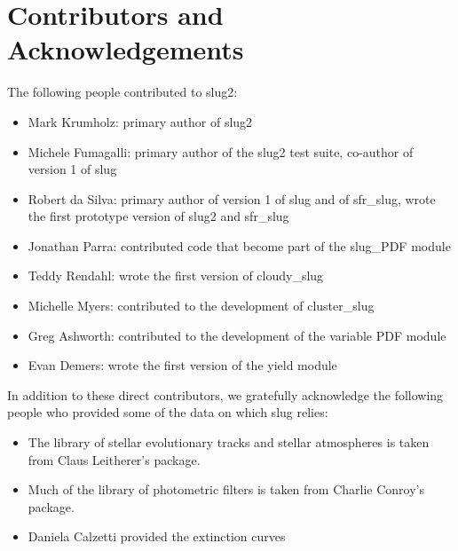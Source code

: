 \documentclass[letterpaper,10pt,english]{sphinxmanual}
\begin{document}
\chapter{Contributors and Acknowledgements}
\label{\detokenize{acknowledgements:contributors-and-acknowledgements}}\label{\detokenize{acknowledgements::doc}}
The following people contributed to slug2:
\begin{itemize}
\item {} 
Mark Krumholz: primary author of slug2

\item {} 
Michele Fumagalli: primary author of the slug2 test suite, co-author of version 1 of slug

\item {} 
Robert da Silva: primary author of version 1 of slug and of sfr\_slug, wrote the first prototype version of slug2 and sfr\_slug

\item {} 
Jonathan Parra: contributed code that become part of the slug\_PDF module

\item {} 
Teddy Rendahl: wrote the first version of cloudy\_slug

\item {} 
Michelle Myers: contributed to the development of cluster\_slug

\item {} 
Greg Ashworth: contributed to the development of the variable PDF module

\item {} 
Evan Demers: wrote the first version of the yield module

\end{itemize}

In addition to these direct contributors, we gratefully acknowledge the following people who provided some of the data on which slug relies:
\begin{itemize}
\item {} 
The library of stellar evolutionary tracks and stellar atmospheres is taken from Claus Leitherer’s  package.

\item {} 
Much of the library of photometric filters is taken from Charlie Conroy’s  package.

\item {} 
Daniela Calzetti provided the extinction curves

\end{itemize}
\end{document}
